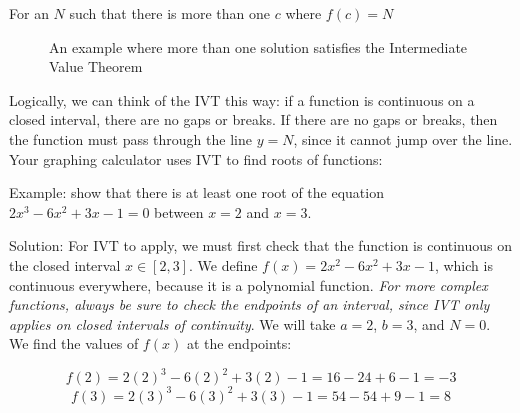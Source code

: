 For an $N$ such that there is more than one $c$ where $f(c) = N$

\begin{figure}[htbp]
\centering
{}
\caption{An example where more than one solution satisfies the Intermediate Value Theorem}
\end{figure}

Logically, we can think of the IVT this way: if a function is continuous on a 
closed interval, there are no gaps or breaks. If there are no gaps or breaks, then 
the function must pass through the line $y=N$, since it cannot jump over the line. 
Your graphing calculator uses IVT to find roots of functions: 

Example: show that there is at least one root of the equation $2x^3-6x^2+3x-1=0$ 
between $x=2$ and $x=3$.

Solution: For IVT to apply, we must first check that the function is continuous on 
the closed interval $x \in \left[2, 3\right]$. We define $f(x) = 2x^2-6x^2+3x-1$, 
which is continuous everywhere, because it is a polynomial function. \textit{For 
more complex functions, always be sure to check the endpoints of an interval, since 
IVT only applies on closed intervals of continuity}. We will take $a=2$, $b=3$, and 
$N=0$. We find the values of $f(x)$ at the endpoints: 

$$f(2)=2(2)^3-6(2)^2+3(2)-1 = 16-24+6-1=-3$$
$$f(3)=2(3)^3-6(3)^2+3(3)-1=54-54+9-1=8$$

